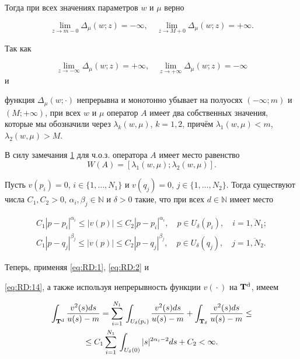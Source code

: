 Тогда при всех значениях параметров $w$ и $\mu$ верно

$$\lim\limits_{z \to m-0} \Delta_{\mu}(w; z)=-\infty, \quad  \lim\limits_{z \to M+0} \Delta_{\mu}(w; z)=+\infty.$$ 

Так как 

$$\lim\limits_{z \to -\infty} \Delta_{\mu}(w; z)=+\infty ,\quad \lim\limits_{z \to +\infty} \Delta_{\mu}(w; z)=-\infty$$ и

функция $\Delta_{\mu}(w; \cdot)$ непрерывна и монотонно убывает на полуосях $(-\infty; m)$ и $(M; +\infty)$, при всех $w$ и $\mu$ оператор $A$ имеет два собственных значения, которые мы обозначили через $\lambda_k(w,\mu)$, $k=1, 2$, причём $\lambda_1(w,\mu)<m$, \mbox{$\lambda_2(w,\mu)>M$. }

В силу {замечания \hyperlink{DR:zam1}{1}} для ч.о.з. оператора $A$ имеет место равенство $$W(A)=[\lambda_1(w, \mu); \lambda_2(w,

\mu)].$$



Пусть $v(p_i) = 0$, $i \in \{ 1, \ldots, N_1 \}$ и $v(q_j) = 0$, $j \in \{1, \ldots, N_2 \}$. Тогда существуют числа $C_1, C_2>0$, $\alpha_i, \beta_j \in {\mathbb N}$ и $\delta>0$ такие, что при всех $d\in \mathbb N$ имеет место

\begin{equation}

\label{eq:RD:14}

\begin{array}{l}

C_1|p-p_i|^{\alpha_i} \leq |v(p)| \leq C_2|p-p_i|^{\alpha_i},\quad

p \in U_\delta(p_i),\quad i=\overline{1, N_1}; \\

C_1|p-q_j|^{\beta_j} \leq |v(p)| \leq C_2|p-q_j|^{\beta_j},\quad p

\in U_\delta(q_j),\quad j=\overline{1, N_2}.

\end{array}

\end{equation}

Теперь, применяя \eqref{eq:RD:1}, \eqref{eq:RD:2} и

\eqref{eq:RD:14}, а также используя непрерывность функции $v({}\cdot{})$ на ${\bf T}^{\rm d}$, имеем

\begin{multline*}

\int _{{\bf T}^{\rm d}} \frac{v^2(s)ds}{u(s)-m}

=\sum_{i=1}^{N_1}\, \int _{U_\delta(p_i)}

\frac{v^2(s)ds}{u(s)-m}+ \int _{{\bf T}_\delta}

\frac{v^2(s)ds}{u(s)-m}  \leq\\

\leq C_1 \sum_{i=1}^{N_1}\, \int _{U_\delta(0)} |s|^{2

\alpha_i-2}ds+ C_2 < \infty.

\end{multline*}



